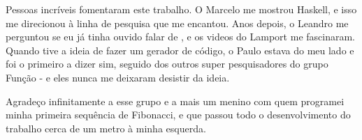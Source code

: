 Pessoas incríveis fomentaram este trabalho. O Marcelo me mostrou Haskell, e isso
me direcionou à linha de pesquisa que me encantou. Anos depois, o Leandro me
perguntou se eu já tinha ouvido falar de \TLAA, e os videos do Lamport me fascinaram. Quando
tive a ideia de fazer um gerador de código, o Paulo estava do meu lado e foi o
primeiro a dizer sim, seguido dos outros super pesquisadores do grupo Função - e eles nunca me deixaram desistir da ideia.

Agradeço infinitamente a esse grupo e a mais um menino com quem programei minha
primeira sequência de Fibonacci, e que passou todo o
desenvolvimento do trabalho cerca de um metro à minha esquerda.